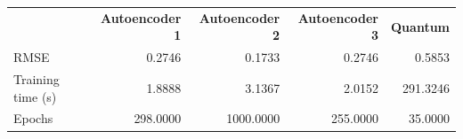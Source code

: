 \begin{tabular}{lrrrr}
 & \textbf{Autoencoder 1} & \textbf{Autoencoder 2} & \textbf{Autoencoder 3} & \textbf{Quantum} \\
RMSE & 0.2746 & {\cellcolor[HTML]{D1E7DD}} 0.1733 & 0.2746 & {\cellcolor[HTML]{F8D7DA}} 0.5853 \\
Training time (s) & {\cellcolor[HTML]{D1E7DD}} 1.8888 & 3.1367 & 2.0152 & {\cellcolor[HTML]{F8D7DA}} 291.3246 \\
Epochs & 298.0000 & {\cellcolor[HTML]{F8D7DA}} 1000.0000 & 255.0000 & {\cellcolor[HTML]{D1E7DD}} 35.0000 \\
\end{tabular}
